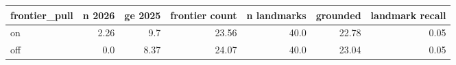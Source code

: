 \begin{tabular}{lrrrrrr}
\toprule
frontier\_pull & n 2026 & ge 2025 & frontier count & n landmarks & grounded & landmark recall \\
\midrule
on & 2.26 & 9.7 & 23.56 & 40.0 & 22.78 & 0.05 \\
off & 0.0 & 8.37 & 24.07 & 40.0 & 23.04 & 0.05 \\
\bottomrule
\end{tabular}
